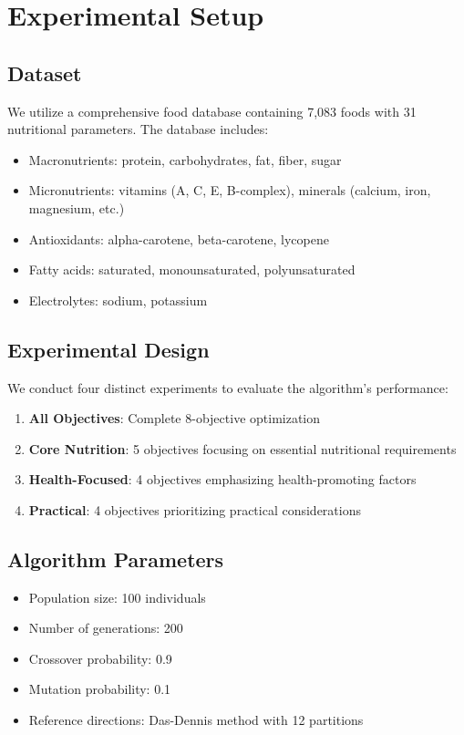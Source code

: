 \documentclass[12pt,a4paper]{article}
\begin{document}
\section{Experimental Setup}

\subsection{Dataset}

We utilize a comprehensive food database containing 7,083 foods with 31 nutritional parameters. The database includes:

\begin{itemize}
    \item Macronutrients: protein, carbohydrates, fat, fiber, sugar
    \item Micronutrients: vitamins (A, C, E, B-complex), minerals (calcium, iron, magnesium, etc.)
    \item Antioxidants: alpha-carotene, beta-carotene, lycopene
    \item Fatty acids: saturated, monounsaturated, polyunsaturated
    \item Electrolytes: sodium, potassium
\end{itemize}

\subsection{Experimental Design}

We conduct four distinct experiments to evaluate the algorithm's performance:

\begin{enumerate}
    \item \textbf{All Objectives}: Complete 8-objective optimization
    \item \textbf{Core Nutrition}: 5 objectives focusing on essential nutritional requirements
    \item \textbf{Health-Focused}: 4 objectives emphasizing health-promoting factors
    \item \textbf{Practical}: 4 objectives prioritizing practical considerations
\end{enumerate}

\subsection{Algorithm Parameters}

\begin{itemize}
    \item Population size: 100 individuals
    \item Number of generations: 200
    \item Crossover probability: 0.9
    \item Mutation probability: 0.1
    \item Reference directions: Das-Dennis method with 12 partitions
\end{itemize}
\end{document}
